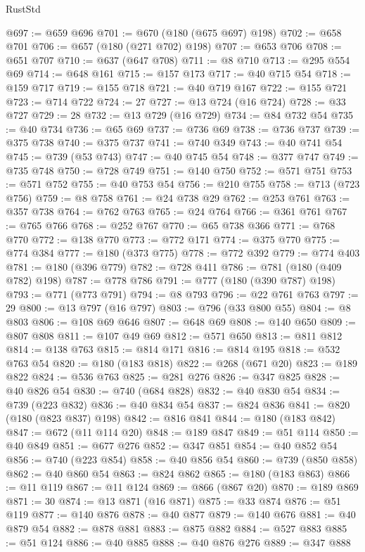 \begin{lexlean}{RustStd}
\begin{coremodule}
@697 := @659 @696
@701 := @670 (@180 (@675 @697) @198)
@702 := @658 @701
@706 := @657 (@180 (@271 @702) @198)
@707 := @653 @706
@708 := @651 @707
@710 := @637 (@647 @708)
@711 := @8 @710
@713 := @295 @554 @69
@714 := @648 @161
@715 := @157 @173
@717 := @40 @715 @54
@718 := @159 @717
@719 := @155 @718
@721 := @40 @719 @167
@722 := @155 @721
@723 := @714 @722
@724 := 27
@727 := @13 @724 (@16 @724)
@728 := @33 @727
@729 := 28
@732 := @13 @729 (@16 @729)
@734 := @84 @732 @54
@735 := @40 @734
@736 := @65 @69
@737 := @736 @69
@738 := @736 @737
@739 := @375 @738
@740 := @375 @737
@741 := @740 @349
@743 := @40 @741 @54
@745 := @739 (@53 @743)
@747 := @40 @745 @54
@748 := @377 @747
@749 := @735 @748
@750 := @728 @749
@751 := @140 @750
@752 := @571 @751
@753 := @571 @752
@755 := @40 @753 @54
@756 := @210 @755
@758 := @713 (@723 @756)
@759 := @8 @758
@761 := @24 @738 @29
@762 := @253 @761
@763 := @357 @738
@764 := @762 @763
@765 := @24 @764
@766 := @361 @761
@767 := @765 @766
@768 := @252 @767
@770 := @65 @738 @366
@771 := @768 @770
@772 := @138 @770
@773 := @772 @171
@774 := @375 @770
@775 := @774 @384
@777 := @180 (@373 @775)
@778 := @772 @392
@779 := @774 @403
@781 := @180 (@396 @779)
@782 := @728 @411
@786 := @781 (@180 (@409 @782) @198)
@787 := @778 @786
@791 := @777 (@180 (@390 @787) @198)
@793 := @771 (@773 @791)
@794 := @8 @793
@796 := @22 @761 @763
@797 := 29
@800 := @13 @797 (@16 @797)
@803 := @796 (@33 @800 @55)
@804 := @8 @803
@806 := @108 @69 @646
@807 := @648 @69
@808 := @140 @650
@809 := @807 @808
@811 := @107 @49 @69
@812 := @571 @650
@813 := @811 @812
@814 := @138 @763
@815 := @814 @171
@816 := @814 @195
@818 := @532 @763 @54
@820 := @180 (@183 @818)
@822 := @268 (@671 @20)
@823 := @189 @822
@824 := @536 @763
@825 := @281 @276
@826 := @347 @825
@828 := @40 @826 @54
@830 := @740 (@684 @828)
@832 := @40 @830 @54
@834 := @739 (@223 @832)
@836 := @40 @834 @54
@837 := @824 @836
@841 := @820 (@180 (@823 @837) @198)
@842 := @816 @841
@844 := @180 (@183 @842)
@847 := @672 (@11 @114 @20)
@848 := @189 @847
@849 := @51 @114
@850 := @40 @849
@851 := @677 @276
@852 := @347 @851
@854 := @40 @852 @54
@856 := @740 (@223 @854)
@858 := @40 @856 @54
@860 := @739 (@850 @858)
@862 := @40 @860 @54
@863 := @824 @862
@865 := @180 (@183 @863)
@866 := @11 @119
@867 := @11 @124
@869 := @866 (@867 @20)
@870 := @189 @869
@871 := 30
@874 := @13 @871 (@16 @871)
@875 := @33 @874
@876 := @51 @119
@877 := @140 @876
@878 := @40 @877
@879 := @140 @676
@881 := @40 @879 @54
@882 := @878 @881
@883 := @875 @882
@884 := @527 @883
@885 := @51 @124
@886 := @40 @885
@888 := @40 @876 @276
@889 := @347 @888

\end{coremodule}
\end{lexlean}
